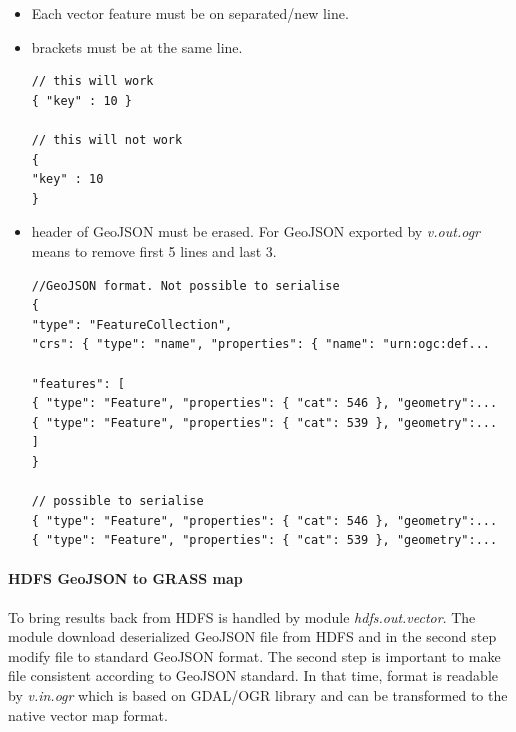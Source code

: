 \documentclass[a4paper,12pt,oneside]{report}
\begin{document}
	\begin{itemize}
		\item Each vector feature must be on separated/new line.
		\item brackets must be at the same line.
		\begin{footnotesize}
			\begin{lstlisting}[style=python]
// this will work
{ "key" : 10 }

// this will not work
{
"key" : 10 
}
			\end{lstlisting}
		\end{footnotesize}
		
		\item header of GeoJSON must be erased. For GeoJSON exported by
		\textit{v.out.ogr} means to remove first 5 lines and last 3.
		\begin{footnotesize}
			\begin{lstlisting}[style=python]
//GeoJSON format. Not possible to serialise
{
"type": "FeatureCollection",
"crs": { "type": "name", "properties": { "name": "urn:ogc:def...

"features": [
{ "type": "Feature", "properties": { "cat": 546 }, "geometry":...
{ "type": "Feature", "properties": { "cat": 539 }, "geometry":...
]
}

// possible to serialise
{ "type": "Feature", "properties": { "cat": 546 }, "geometry":...
{ "type": "Feature", "properties": { "cat": 539 }, "geometry":...
			\end{lstlisting}
		\end{footnotesize}
	\end{itemize}
	
	
	
    \paragraph{HDFS GeoJSON to GRASS map}
    To bring results back from HDFS is handled by module \textit{hdfs.out.vector}.
    The module download deserialized GeoJSON file from HDFS and in the second step
    modify file to standard GeoJSON format. The second step is important to make
    file consistent according to GeoJSON standard. In that time, format is readable
    by \textit{v.in.ogr} which is based on GDAL/OGR library and can be transformed
    to the native vector map format.
    
\end{document}
